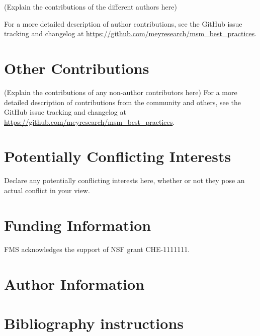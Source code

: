 \documentclass[9pt,bestpractices]{livecoms}
\newcommand{\githubrepository}{\url{https://github.com/meyresearch/msm_best_practices}}  %
\begin{document}
(Explain the contributions of the different authors here)

For a more detailed description of author contributions,
see the GitHub issue tracking and changelog at \githubrepository.

\section{Other Contributions}
%

(Explain the contributions of any non-author contributors here)
For a more detailed description of contributions from the community and others, see the GitHub issue tracking and changelog at \githubrepository.

\section{Potentially Conflicting Interests}

Declare any potentially conflicting interests here, whether or not they pose an actual conflict in your view.

\section{Funding Information}
FMS acknowledges the support of NSF grant CHE-1111111.

\section*{Author Information}
\makeorcid


\section{Bibliography instructions}
\end{document}
